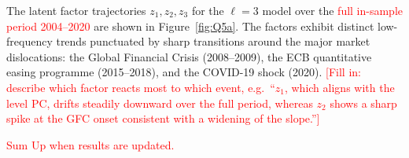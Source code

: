 The latent factor trajectories $z_1, z_2, z_3$ for the $\ell = 3$ model
over the \textcolor{red}{full in-sample period 2004--2020} are shown in
Figure~\ref{fig:Q5a}. The factors exhibit distinct low-frequency trends
punctuated by sharp transitions around the major market dislocations:
the Global Financial Crisis (2008--2009), the ECB quantitative easing
programme (2015--2018), and the COVID-19 shock (2020).
\textcolor{red}{[Fill in: describe which factor reacts most to which
event, e.g.\ ``$z_1$, which aligns with the level PC, drifts steadily
downward over the full period, whereas $z_2$ shows a sharp spike at the
GFC onset consistent with a widening of the slope.'']}


\textcolor{red}{Sum Up when results are updated.}














